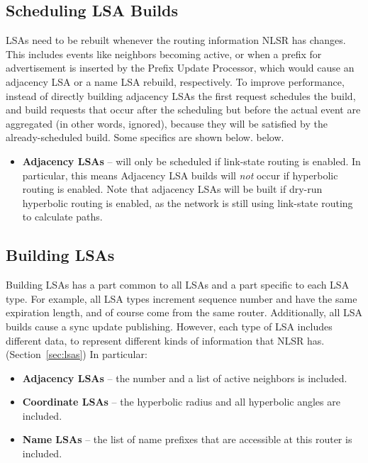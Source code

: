 \subsection{Scheduling LSA Builds}
LSAs need to be rebuilt whenever the routing information NLSR has
changes. This includes events like neighbors becoming active, or when
a prefix for advertisement is inserted by the Prefix Update Processor,
which would cause an adjacency LSA or a name LSA rebuild,
respectively. To improve performance, instead of directly building
adjacency LSAs the first request schedules the build, and build requests
that occur after the scheduling but before the actual event are
aggregated (in other words, ignored), because they will be satisfied
by the already-scheduled build. Some specifics are shown below.
below.
\begin{itemize}
\item \textbf{Adjacency LSAs} -- will only be scheduled if link-state
  routing is enabled. In particular, this means Adjacency LSA builds
  will \emph{not} occur if hyperbolic routing is enabled. Note that
  adjacency LSAs will be built if dry-run hyperbolic routing is
  enabled, as the network is still using link-state routing to
  calculate paths.
\end{itemize}

\subsection{Building LSAs}
Building LSAs has a part common to all LSAs and a part specific to
each LSA type. For example, all LSA types increment sequence number
and have the same expiration length, and of course come from the same
router. Additionally, all LSA builds cause a sync update
publishing. However, each type of LSA includes different data, to
represent different kinds of information that NLSR
has. (Section~\ref{sec:lsas}) In particular:
\begin{itemize}
  \item \textbf{Adjacency LSAs} -- the number and a list of active
    neighbors is included.
  \item \textbf{Coordinate LSAs} -- the hyperbolic radius and all
    hyperbolic angles are included.
  \item \textbf{Name LSAs} -- the list of name prefixes that are
    accessible at this router is included.
\end{itemize}

